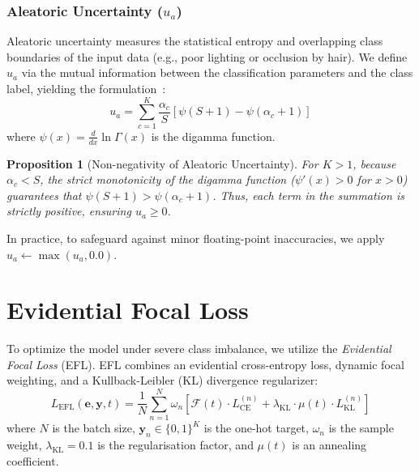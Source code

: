 \documentclass[11pt]{article}
\newtheorem{proposition}{Proposition}
\begin{document}
\subsubsection{Aleatoric Uncertainty ($u_a$)}

Aleatoric uncertainty measures the statistical entropy and overlapping class boundaries of the input data (e.g., poor lighting or occlusion by hair). We define $u_a$ via the mutual information between the classification parameters and the class label, yielding the formulation~\cite{malinin2018predictive}:
\begin{equation}\label{eq:u_a}
    u_a = \sum_{c=1}^K \frac{\alpha_c}{S} \left[ \psi(S + 1) - \psi(\alpha_c + 1) \right]
\end{equation}
where $\psi(x) = \frac{d}{dx}\ln\Gamma(x)$ is the digamma function.

\begin{proposition}[Non-negativity of Aleatoric Uncertainty]
For $K > 1$, because $\alpha_c < S$, the strict monotonicity of the digamma function ($\psi'(x) > 0$ for $x > 0$) guarantees that $\psi(S+1) > \psi(\alpha_c+1)$. Thus, each term in the summation is strictly positive, ensuring $u_a \ge 0$.
\end{proposition}

In practice, to safeguard against minor floating-point inaccuracies, we apply $u_a \leftarrow \max(u_a, 0.0)$.

\section{Evidential Focal Loss}\label{sec:efl}

To optimize the model under severe class imbalance, we utilize the \emph{Evidential Focal Loss} (EFL). EFL combines an evidential cross-entropy loss, dynamic focal weighting, and a Kullback-Leibler (KL) divergence regularizer:
\begin{equation}\label{eq:efl}
    L_{\text{EFL}}(\bm{e}, \bm{y}, t) = \frac{1}{N} \sum_{n=1}^N \omega_n \left[ \mathcal{F}(t) \cdot L_{\text{CE}}^{(n)} + \lambda_{\text{KL}} \cdot \mu(t) \cdot L_{\text{KL}}^{(n)} \right]
\end{equation}
where $N$ is the batch size, $\bm{y}_n \in \{0, 1\}^K$ is the one-hot target, $\omega_n$ is the sample weight, $\lambda_{\text{KL}} = 0.1$ is the regularisation factor, and $\mu(t)$ is an annealing coefficient.
\end{document}
